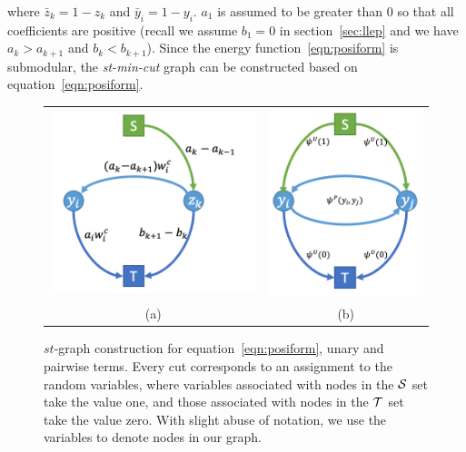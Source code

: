 \noindent where $\bar{z}_k = 1 - z_k$ and $\bar{y}_i = 1 - y_i$.
$a_1$ is assumed to be greater than $0$ so that all coefficients
are positive (recall we assume $b_1=0$ in section~\ref{sec:llep}
and we have $a_k > a_{k+1}$ and $b_k < b_{k+1}$). Since the energy function~\eqref{eqn:posiform}
is submodular, the \emph{st-min-cut} graph can be constructed 
based on equation~\eqref{eqn:posiform}.


\begin{figure}[t]
  \centering
  \setlength{\tabcolsep}{2pt}
  \begin{tabular}{cc}
    \includegraphics[width=0.47\columnwidth]{Part2/figures/ho.png}&
                                                                         \includegraphics[width=0.37\columnwidth]{Part2/figures/up.png}\\
                                                                         {\small (a)} & {\small (b)} 
  \end{tabular}
  \caption{\label{fig:stmincut} $st$-graph construction for
    equation~\eqref{eqn:posiform}, unary and pairwise terms.
    Every cut corresponds to an assignment to the random
    variables, where variables associated with nodes in the ${\mathcal{S}}$
    set take the value one, and those associated with nodes in
    the ${\mathcal{T}}$ set take the value zero. With slight abuse of
    notation, we use the variables to denote nodes in our graph.}
\end{figure}


